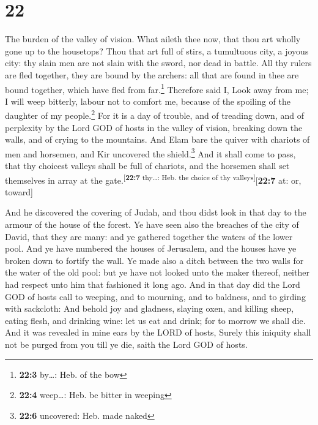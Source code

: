 \hypertarget{section-21}{%
\section{22}\label{section-21}}

 The burden of the valley of vision. What aileth thee now,
that thou art wholly gone up to the housetops?  Thou that
art full of stirs, a tumultuous city, a joyous city: thy slain men are
not slain with the sword, nor dead in battle.  All thy
rulers are fled together, they are bound by the archers: all that are
found in thee are bound together, which have fled from far.\footnote{\textbf{22:3}
  by\ldots: Heb. of the bow}  Therefore said I, Look away
from me; I will weep bitterly, labour not to comfort me, because of the
spoiling of the daughter of my people.\footnote{\textbf{22:4}
  weep\ldots: Heb. be bitter in weeping}  For it is a day
of trouble, and of treading down, and of perplexity by the Lord GOD of
hosts in the valley of vision, breaking down the walls, and of crying to
the mountains.  And Elam bare the quiver with chariots of
men and horsemen, and Kir uncovered the shield.\footnote{\textbf{22:6}
  uncovered: Heb. made naked}  And it shall come to pass,
that thy choicest valleys shall be full of chariots, and the horsemen
shall set themselves in array at the
gate.\textsuperscript{{[}\textbf{22:7} thy\ldots: Heb. the choice of thy
valleys{]}}{[}\textbf{22:7} at: or, toward{]}

 And he discovered the covering of Judah, and thou didst
look in that day to the armour of the house of the forest.
 Ye have seen also the breaches of the city of David, that
they are many: and ye gathered together the waters of the lower pool.
 And ye have numbered the houses of Jerusalem, and the
houses have ye broken down to fortify the wall.  Ye made
also a ditch between the two walls for the water of the old pool: but ye
have not looked unto the maker thereof, neither had respect unto him
that fashioned it long ago.  And in that day did the Lord
GOD of hosts call to weeping, and to mourning, and to baldness, and to
girding with sackcloth:  And behold joy and gladness,
slaying oxen, and killing sheep, eating flesh, and drinking wine: let us
eat and drink; for to morrow we shall die.  And it was
revealed in mine ears by the LORD of hosts, Surely this iniquity shall
not be purged from you till ye die, saith the Lord GOD of hosts.


